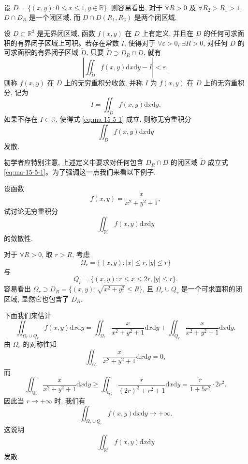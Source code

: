 \begin{example}\label{example:ma-15-5-1}
设 $D=\{(x,y):0\leqslant x\leqslant1,y\in\mathbb R\}$, 则容易看出, 对于 $\forall R>0$ 及 $\forall R_2>R_1>1$, $D\cap D_R$ 是一个闭区域, 而 $D\cap D(R_1,R_2)$ 是两个闭区域.
\end{example}


\begin{definition}\label{definition:ma-15-5-1}
设 $D\subset\mathbb R^2$ 是无界闭区域, 函数 $f(x,y)$ 在 $D$ 上有定义, 并且在 $D$ 的任何可求面积的有界闭子区域上可积。若存在常数 $I$, 使得对于 $\forall\varepsilon>0$, $\exists R>0$, 对任何 $D$ 的可求面积的有界闭子区域 $\widetilde D$, 只要 $\widetilde D\supset D_R\cap D$, 就有
\begin{equation}
  \left|\iint_{\widetilde D}f(x,y)\mathrm dx\mathrm dy-I\right|<\varepsilon,
  \label{eq:ma-15-5-1}
\end{equation}
则称 $f(x,y)$ 在 $D$ 上的无穷重积分收敛, 并称 $I$ 为 $f(x,y)$ 在 $D$ 上的无穷重积分, 记为
\[
  I=\iint_D f(x,y)\mathrm dx\mathrm dy.
\]
如果不存在 $I\in\mathbb R$, 使得式 \eqref{eq:ma-15-5-1} 成立, 则称无穷重积分
\[
  \iint_D f(x,y)\mathrm dx\mathrm dy
\]
发散.
\end{definition}

初学者应特别注意, 上述定义中要求对任何包含 $D_R\cap D$ 的闭区域 $\widetilde D$ 成立式 \eqref{eq:ma-15-5-1}。为了强调这一点我们来看以下例子.

\begin{example}\label{example:ma-15-5-2}
设函数
\[
  f(x,y)=\frac{x}{x^2+y^2+1},
\]
试讨论无穷重积分
\[
  \iint_{\mathbb R^2} f(x,y)\mathrm dx\mathrm dy
\]
的敛散性.
\end{example}


\begin{solve}
对于 $\forall R>0$, 取 $r>R$, 考虑
\[
  \Omega_r=\{(x,y):|x|\leqslant r, |y|\leqslant r\}
\]
与
\[
  Q_r=\{(x,y):r\leqslant x\leqslant2r, |y|\leqslant r\}.
\]
容易看出 $\Omega_r\supset D_R=\{(x,y):\sqrt{x^2+y^2}\leqslant R\}$, 且 $\Omega_r\cup Q_r$ 是一个可求面积的闭区域, 显然它也包含了 $D_R$.

下面我们来估计
\[
  \iint_{\Omega_r\cup Q_r} f(x,y)\mathrm dx\mathrm dy
  =\iint_{\Omega_r}\frac{x}{x^2+y^2+1}\mathrm dx\mathrm dy
  +\iint_{Q_r}\frac{x}{x^2+y^2+1}\mathrm dx\mathrm dy.
\]
由 $\Omega_r$ 的对称性知
\[
  \iint_{\Omega_r}\frac{x}{x^2+y^2+1}\mathrm dx\mathrm dy=0,
\]
而
\[
  \iint_{Q_r}\frac{x}{x^2+y^2+1}\mathrm dx\mathrm dy
  \geqslant\iint_{Q_r}\frac{r}{(2r)^2+r^2+1}\mathrm dx\mathrm dy
  =\frac{r}{1+5r^2}\cdot2r^2.
\]
因此当 $r\to+\infty$ 时, 我们有
\[
  \iint_{\Omega_r\cup Q_r} f(x,y)\mathrm dx\mathrm dy\to+\infty.
\]
这说明
\[
  \iint_{\mathbb R^2} f(x,y)\mathrm dx\mathrm dy
\]
发散.
\end{solve}


